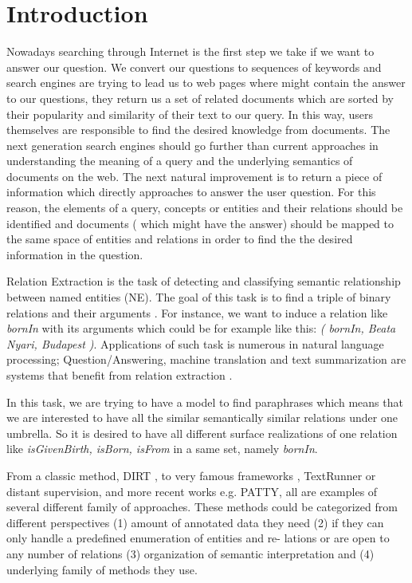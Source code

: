 \chapter{Introduction}
Nowadays searching through Internet is the first step we take if we want to
answer our question.
We convert our questions to sequences of keywords and search engines are trying 
to lead us to web pages where might contain the answer to our questions, they return us a set of related
documents which are sorted by their popularity and similarity of their text to our query.
In this way, users themselves are responsible to find the desired knowledge 
from documents. The next generation search engines should go further than current 
approaches in understanding the meaning of a query and the underlying semantics of documents on 
the web. The next natural improvement is to return a piece of information which directly approaches to 
answer the user question. For this reason, the elements of a query, concepts or entities and 
their relations should be identified and documents ( which might have the answer) should be mapped to the 
same space of entities and relations in order to find the the desired information in the question.


Relation Extraction is the task of detecting and classifying semantic relationship 
between named entities (NE). The goal of this task is to find a triple
of binary relations and their arguments \cite{Androutsopoulos2009}. For instance, we want to induce a
relation like \emph{bornIn} with its arguments which could be for example like this:\emph{ (
bornIn, Beata Nyari, Budapest )}. Applications of such task is numerous
in natural language processing; Question/Answering, machine translation and
text summarization are systems that benefit from relation extraction
\cite{Androutsopoulos2009}.

In this task, we are trying to have a model to find paraphrases which means
that we are interested to have all the similar semantically similar relations under
one umbrella. So it is desired to have all different surface realizations of one
relation like \emph{isGivenBirth, isBorn, isFrom} in a same set, namely \emph{bornIn}.

From a classic method, DIRT \cite{Lin2001}, to very famous frameworks ,
TextRunner\cite{Bankoa} or distant supervision\cite{Mintz2009}, and more recent works e.g. PATTY\cite{Nakashole2012a},
all are examples of several different family of approaches. These methods could
be categorized from different perspectives (1) amount of annotated data they
need (2) if they can only handle a predefined enumeration of entities and re-
lations or are open to any number of relations (3) organization of semantic
interpretation and (4) underlying family of methods they use.


